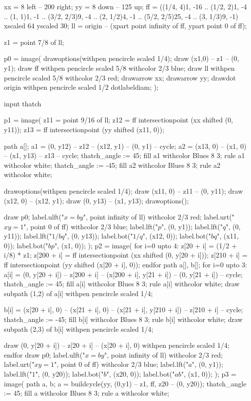 \documentclass[oneside]{scrbook}
\begin{document}
xx = 8 left -- 200 right; 
yy = 8 down -- 125 up; 
ff = ((1/4, 4){1, -16} .. (1/2, 2){1, -4} .. (1, 1){1, -1} .. (3/2, 2/3){9, -4} .. (2, 1/2){4, -1} .. (5/2, 2/5){25, -4} .. (3, 1/3){9, -1})
xscaled 64 yscaled 30;  
ll = origin -- (xpart point infinity of ff, ypart point 0 of ff);

z1 = point 7/8 of ll;

p0 = image(
drawoptions(withpen pencircle scaled 1/4);
draw (x1,0) -- z1 -- (0, y1);
draw ff withpen pencircle scaled 5/8 withcolor 2/3 blue;
draw ll withpen pencircle scaled 5/8 withcolor 2/3 red;
drawarrow xx;
drawarrow yy;
drawdot origin withpen pencircle scaled 1/2 dotlabeldiam;
);

input thatch

p1 = image(
z11 = point 9/16 of ll;
z12 = ff intersectionpoint (xx shifted (0, y11));
z13 = ff intersectionpoint (yy shifted (x11, 0));

path a[];
a1 = (0, y12) -- z12 -- (x12, y1) -- (0, y1) -- cycle;
a2 = (x13, 0) -- (x1, 0) -- (x1, y13) -- z13 -- cycle;
thatch_angle := 45;
fill a1 withcolor Blues 8 3;
rule a1 withcolor white;
thatch_angle := -45;
fill a2 withcolor Blues 8 3;
rule a2 withcolor white;

drawoptions(withpen pencircle scaled 1/4);
draw (x11, 0) -- z11 -- (0, y11);
draw (x12, 0) -- (x12, y1);
draw (0, y13) -- (x1, y13);
drawoptions();

draw p0;
label.ulft("$x=by$", point infinity of ll) withcolor 2/3 red;
label.urt("$xy=1$", point 0 of ff) withcolor 2/3 blue;
label.lft("$p$", (0, y1));
label.lft("$q$", (0, y11));
label.lft("$1/bq$", (0, y13));
label.bot("$1/q$", (x12, 0));
label.bot("$bq$", (x11, 0));
label.bot("$bp$", (x1, 0));
);
p2 = image(
for i=0 upto 4:
    z[20 + i] = (1/2 + i/8)  * z1;
    z[200 + i] = ff intersectionpoint (xx shifted (0, y[20 + i]));
    z[210 + i] = ff intersectionpoint (yy shifted (x[20 + i], 0));
endfor
path a[], b[];
for i=0 upto 3:
    a[i] = (0, y[20 + i]) -- z[200 + i] -- (x[200 + i], y[21 + i]) -- (0, y[21 + i]) -- cycle;
    thatch_angle := 45;
    fill a[i] withcolor Blues 8 3; rule a[i] withcolor white; 
    draw subpath (1,2) of a[i] withpen pencircle scaled 1/4;
    
    b[i] = (x[20 + i], 0) -- (x[21 + i], 0) -- (x[21 + i], y[210 + i]) -- z[210 + i] -- cycle;
    thatch_angle := -45;
    fill b[i] withcolor Blues 8 3; rule b[i] withcolor white; 
    draw subpath (2,3) of b[i] withpen pencircle scaled 1/4;

    draw (0, y[20 + i]) -- z[20 + i] -- (x[20 + i], 0) withpen pencircle scaled 1/4;
endfor
draw p0;
label.ulft("$x=by$", point infinity of ll) withcolor 2/3 red;
label.urt("$xy=1$", point 0 of ff) withcolor 2/3 blue;
label.lft("$a$", (0, y1));
label.lft("$1$", (0, y20));
label.bot("$b$", (x20, 0));
label.bot("$ab$", (x1, 0));
);
p3 = image(
path a, b;
a = buildcycle(yy, (0,y1) -- z1, ff, z20 -- (0, y20));
thatch_angle := 45;
fill a withcolor Blues 8 3; rule a withcolor white; 
\end{document}
